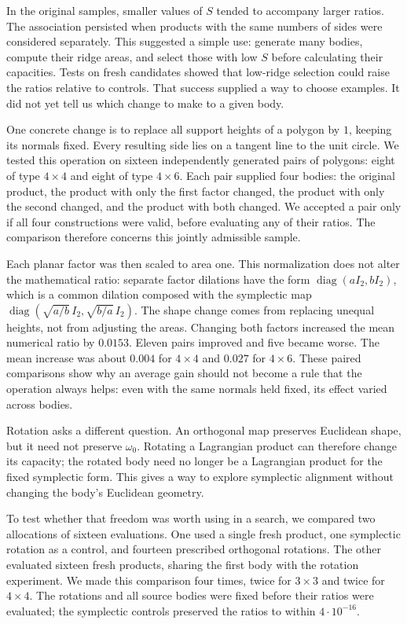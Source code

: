 \documentclass[11pt,a4paper]{article}
\begin{document}
In the original samples, smaller values of $S$ tended to accompany larger
ratios. The association persisted when products with the same numbers of sides
were considered separately. This suggested a simple use: generate many bodies,
compute their ridge areas, and select those with low $S$ before calculating
their capacities. Tests on fresh candidates showed that low-ridge selection
could raise the ratios relative to controls. That success supplied a way to
choose examples. It did not yet tell us which change to make to a given body.

One concrete change is to replace all support heights of a polygon by $1$,
keeping its normals fixed. Every resulting side lies on a tangent line to the
unit circle. We tested this operation on sixteen independently generated pairs
of polygons: eight of type $4\times4$ and eight of type $4\times6$. Each pair
supplied four bodies: the original product, the product with only the first
factor changed, the product with only the second changed, and the product with
both changed. We accepted a pair only if all four constructions were valid,
before evaluating any of their ratios. The comparison therefore concerns this
jointly admissible sample.

Each planar factor was then scaled to area one. This normalization does not
alter the mathematical ratio: separate factor dilations have the form
$\operatorname{diag}(aI_2,bI_2)$, which is a common dilation composed with the
symplectic map
$\operatorname{diag}(\sqrt{a/b}\,I_2,\sqrt{b/a}\,I_2)$.
The shape change comes from replacing unequal heights, not from adjusting the
areas. Changing both factors increased the mean numerical ratio by $0.0153$.
Eleven pairs improved and five became worse. The mean increase was about
$0.004$ for $4\times4$ and $0.027$ for $4\times6$. These paired comparisons
show why an average gain should not become a rule that the operation always
helps: even with the same normals held fixed, its effect varied across bodies.

Rotation asks a different question. An orthogonal map preserves Euclidean shape,
but it need not preserve $\omega_0$. Rotating a Lagrangian product can therefore
change its capacity; the rotated body need no longer be a Lagrangian product
for the fixed symplectic form. This gives a way to explore symplectic alignment
without changing the body's Euclidean geometry.

To test whether that freedom was worth using in a search, we compared two
allocations of sixteen evaluations. One used a single fresh product, one
symplectic rotation as a control, and fourteen prescribed orthogonal rotations.
The other evaluated sixteen fresh products, sharing the first body with the
rotation experiment. We made this comparison four times, twice for $3\times3$
and twice for $4\times4$. The rotations and all source bodies were fixed before
their ratios were evaluated; the symplectic controls preserved the ratios to
within $4\cdot10^{-16}$.
\end{document}
